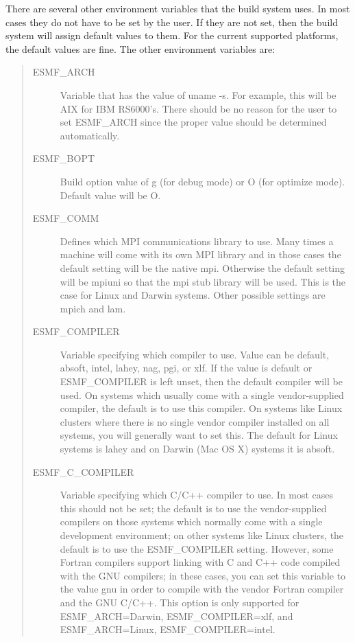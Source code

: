 There are several other environment variables that the build system uses.
In most cases they do not have to be set by the user.  If they are not
set, then the build system will assign default values to them.  For the
current supported platforms, the default values are fine.  The other
environment variables are:
\begin{quote}
\begin{description}

  \item[ESMF\_ARCH] Variable that has the value of uname -s.  
                 For example, this will be AIX for IBM
                 RS6000's.  There should be no reason for the
                 user to set ESMF\_ARCH since the proper value should be
                 determined automatically.

  \item[ESMF\_BOPT] Build option value of g (for debug mode) or O (for
                 optimize mode).  Default value will be O.

  \item[ESMF\_COMM] Defines which MPI communications library to use.  
                 Many times a machine will come with its own MPI 
                 library and in those cases the default setting 
                 will be the native mpi.  Otherwise the default setting 
                 will be mpiuni so that the mpi stub library will be used.
                 This is the case for Linux and Darwin systems.
                 Other possible settings are mpich and lam.

\item[ESMF\_COMPILER]

Variable specifying which compiler to use.  Value can be default,
absoft, intel, lahey, nag, pgi, or xlf.  If the value is default or
ESMF\_COMPILER is left unset, then the default compiler will be
used. On systems which usually come with a single vendor-supplied
compiler, the default is to use this compiler.  On systems like
Linux clusters where there is no single vendor compiler installed
on all systems, you will generally want to set this.
The default for Linux systems is lahey and on Darwin (Mac OS X)
systems it is absoft.

\item[ESMF\_C\_COMPILER]

Variable specifying which C/C++ compiler to use.   In most cases
this should not be set; the default is to use the vendor-supplied
compilers on those systems which normally come with a single
development environment; on other systems like Linux clusters,
the default is to use the ESMF\_COMPILER setting.  However, some
Fortran compilers support linking with C and C++ code compiled
with the GNU compilers; in these cases, you can set this variable
to the value gnu in order to compile with the vendor Fortran
compiler and the GNU C/C++.   This option is only supported for
ESMF\_ARCH=Darwin, ESMF\_COMPILER=xlf, and ESMF\_ARCH=Linux,
ESMF\_COMPILER=intel.


\end{description}
\end{quote}
